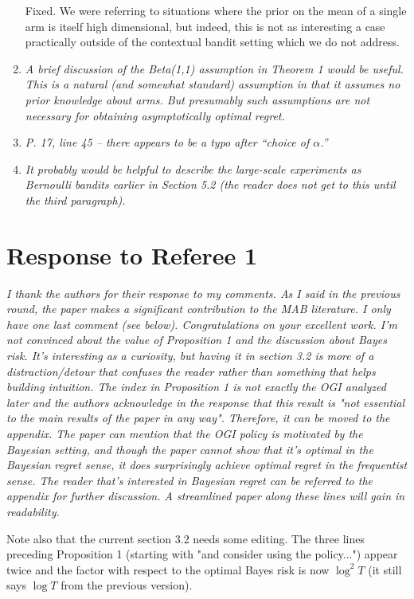 \documentclass[11pt]{article}
\newcommand{\1}{\ensuremath{\mathbf{1}}} %
\theoremstyle{thm-sf}
\begin{document}
\begin{enumerate}
	Fixed. We were referring to situations where the prior on the mean of a single arm is itself high dimensional, but indeed, this is not as interesting a case practically outside of the contextual bandit setting which we do not address. 
	
	\item {\it A brief discussion of the Beta(1,1) assumption in Theorem 1 would be useful. This is a natural (and somewhat standard) assumption in that it assumes no prior knowledge about arms. But presumably such assumptions are not necessary for obtaining asymptotically optimal regret.
	}
	
	\item {\it  P. 17, line 45 – there appears to be a typo after “choice of $\alpha$.”}
	
	\item {\it It probably would be helpful to describe the large-scale experiments as Bernoulli bandits earlier in Section 5.2 (the reader does not get to this until the third paragraph).}
	\end{enumerate}
	
	\newpage
	\section{Response to  Referee 1}
	
	{\it I thank the authors for their response to my comments. As I said in the previous round, the paper makes a significant contribution to the MAB literature. I only have one last comment (see below). Congratulations on your excellent work.
		I'm not convinced about the value of Proposition 1 and the discussion about Bayes risk. It's interesting as a curiosity, but having it in section 3.2 is more of a distraction/detour that confuses the reader rather than something that helps building intuition. The index in Proposition 1 is not exactly the OGI analyzed later and the authors acknowledge in the response that this result is "not essential to the main results of the paper in any way". Therefore, it can be moved to the appendix. The paper can mention that the OGI policy is motivated by the Bayesian setting, and though the paper cannot show that it's optimal in the Bayesian regret sense, it does surprisingly achieve optimal regret in the frequentist sense. The reader that's interested in Bayesian regret can be referred to the appendix for further discussion. A streamlined paper along these lines will gain in readability.
		
Note also that the current section 3.2 needs some editing. The three lines preceding Proposition 1 (starting with "and consider using the policy...") appear twice and the factor with respect to the optimal Bayes risk is now $\log^2 T$ (it still says $\log T$ from the previous version).	
}
	
\end{document}
